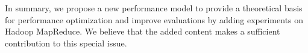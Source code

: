 \documentclass[12pt,reqno]{amsart}
\theoremstyle{plain}
\numberwithin{equation}{section}
\theoremstyle{plain}
\numberwithin{equation}{section}
\begin{document}
In summary, we propose a new performance model to provide a theoretical basis for performance optimization and improve evaluations by adding experiments on Hadoop MapReduce. 
We believe that the added content makes a sufficient contribution to this special issue.


% 
\end{document}

